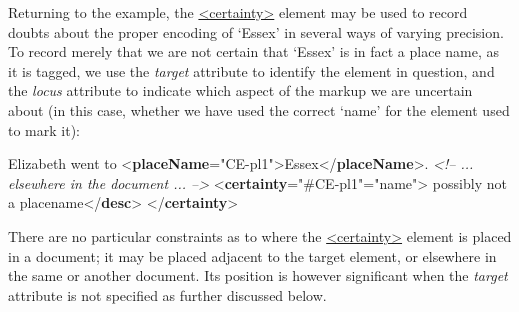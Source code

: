 Returning to the example, the \hyperref[TEI.certainty]{<certainty>} element may be used to record doubts about the proper encoding of ‘Essex’ in several ways of varying precision. To record merely that we are not certain that ‘Essex’ is in fact a place name, as it is tagged, we use the {\itshape target} attribute to identify the element in question, and the {\itshape locus} attribute to indicate which aspect of the markup we are uncertain about (in this case, whether we have used the correct ‘name’ for the element used to mark it): \par\bgroup{}\exampleFont \begin{shaded}\noindent\mbox{}Elizabeth went to\mbox{}\newline 
{<\textbf{placeName}\hspace*{1em}{xml:id}="{CE-pl1}">}Essex{</\textbf{placeName}>}.\mbox{}\newline 
\mbox{}\newline 
\textit{<!-- ... elsewhere in the document ... -->}\mbox{}\newline 
{<\textbf{certainty}\hspace*{1em}{target}="{\#CE-pl1}"\hspace*{1em}{locus}="{name}">}\mbox{}\newline 
{}possibly not a placename{</\textbf{desc}>}\mbox{}\newline 
{</\textbf{certainty}>}\end{shaded}\egroup\par \noindent  There are no particular constraints as to where the \hyperref[TEI.certainty]{<certainty>} element is placed in a document; it may be placed adjacent to the target element, or elsewhere in the same or another document. Its position is however significant when the {\itshape target} attribute is not specified as further discussed below.\par
